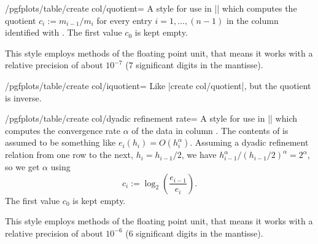 \begin{stylekey}{/pgfplots/table/create col/quotient=}
	A style for use in |\pgfplotstablecreatecol| which computes the quotient $c_i := m_{i-1} / m_i$ for every entry $i = 1,\dotsc, (n-1)$ in the column identified with . The first value $c_0$ is kept empty.

\begin{codeexample}[]

\end{codeexample}
	This style employs methods of the floating point unit, that means it works with a relative precision of about $10^{-7}$ ($7$ significant digits in the mantisse).
\end{stylekey}

\begin{stylekey}{/pgfplots/table/create col/iquotient=}
	Like |create col/quotient|, but the quotient is inverse.
\end{stylekey}

\begin{stylekey}{/pgfplots/table/create col/dyadic refinement rate=}
	A style for use in |\pgfplotstablecreatecol| which computes the convergence rate $\alpha$ of the data in column . The contents of  is assumed to be something like $e_i(h_i) = O(h_i^\alpha)$. Assuming a dyadic refinement relation from one row to the next, $h_i = h_{i-1}/2$, we have $h_{i-1}^\alpha / (h_{i-1}/2)^\alpha = 2^\alpha$, so we get $\alpha$ using 
	\[ c_i := \log_2\left( \frac{e_{i-1}}{e_i} \right). \]
	The first value $c_0$ is kept empty.

\begin{codeexample}[]
\end{codeexample}
	This style employs methods of the floating point unit, that means it works with a relative precision of about $10^{-6}$ ($6$ significant digits in the mantisse).
\end{stylekey}

